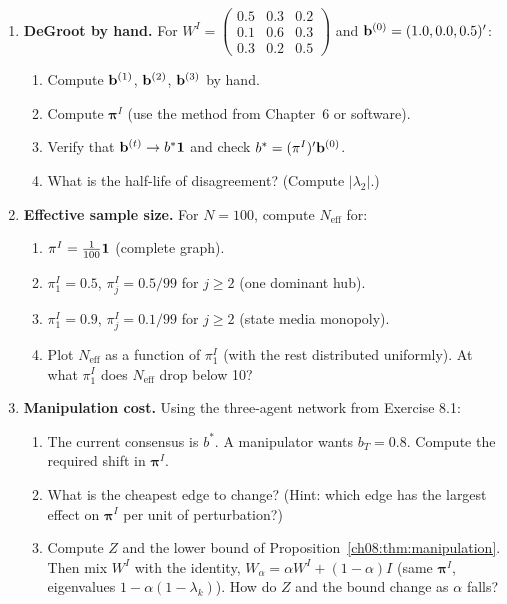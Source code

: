 \documentclass[../structural_economics_book.tex]{subfiles}
\begin{document}
\begin{enumerate}[label=\textbf{8.\arabic*}, leftmargin=3em]

\item \textbf{DeGroot by hand.} For $W^I = \begin{pmatrix} 0.5 & 0.3 & 0.2 \\ 0.1 & 0.6 & 0.3 \\ 0.3 & 0.2 & 0.5 \end{pmatrix}$ and $\mathbf{b}^{(0)} = (1.0, 0.0, 0.5)'$:
\begin{enumerate}
\item Compute $\mathbf{b}^{(1)}$, $\mathbf{b}^{(2)}$, $\mathbf{b}^{(3)}$ by hand.
\item Compute $\boldsymbol{\pi}^I$ (use the method from Chapter~6 or software).
\item Verify that $\mathbf{b}^{(t)} \to b^*\mathbf{1}$ and check $b^* = (\pi^I)'\mathbf{b}^{(0)}$.
\item What is the half-life of disagreement? (Compute $|\lambda_2|$.)
\end{enumerate}

\item \textbf{Effective sample size.} For $N = 100$, compute $N_{\text{eff}}$ for:
\begin{enumerate}
\item $\pi^I = \frac{1}{100}\mathbf{1}$ (complete graph).
\item $\pi^I_1 = 0.5$, $\pi^I_j = 0.5/99$ for $j \geq 2$ (one dominant hub).
\item $\pi^I_1 = 0.9$, $\pi^I_j = 0.1/99$ for $j \geq 2$ (state media monopoly).
\item Plot $N_{\text{eff}}$ as a function of $\pi^I_1$ (with the rest distributed uniformly). At what $\pi^I_1$ does $N_{\text{eff}}$ drop below 10?
\end{enumerate}

\item \textbf{Manipulation cost.} Using the three-agent network from Exercise 8.1:
\begin{enumerate}
\item The current consensus is $b^*$. A manipulator wants $b_T = 0.8$. Compute the required shift in $\boldsymbol{\pi}^I$.
\item What is the cheapest edge to change? (Hint: which edge has the largest effect on $\boldsymbol{\pi}^I$ per unit of perturbation?)
\item Compute $Z$ and the lower bound of Proposition~\ref{ch08:thm:manipulation}. Then mix $W^I$ with the identity, $W_\alpha = \alpha W^I + (1-\alpha)I$ (same $\boldsymbol{\pi}^I$, eigenvalues $1 - \alpha(1-\lambda_k)$). How do $Z$ and the bound change as $\alpha$ falls?
\end{enumerate}


\end{enumerate}
\end{document}
